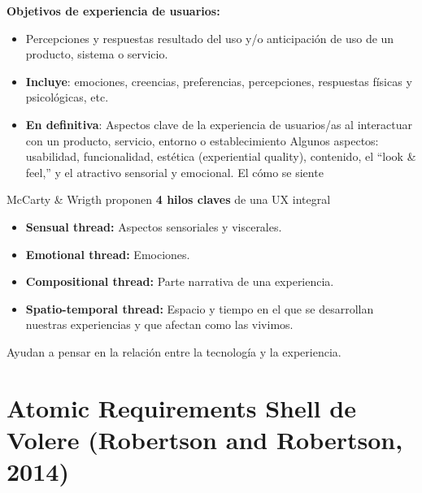 \documentclass[12pt]{report} %
\begin{document}
\textbf{Objetivos de experiencia de usuarios:}

\begin{itemize}

\item
  Percepciones y respuestas resultado del uso y/o anticipación de uso de
  un producto, sistema o servicio.
\item
\textbf{Incluye}: emociones, creencias, preferencias, percepciones, respuestas
  físicas y psicológicas, etc.
\item
\textbf{En definitiva}: Aspectos clave de la experiencia de usuarios/as al
  interactuar con un producto, servicio, entorno o establecimiento
  Algunos aspectos: usabilidad, funcionalidad, estética (experiential
  quality), contenido, el ``look \& feel,'' y el atractivo sensorial y
  emocional. El cómo se siente
\end{itemize}

McCarty \& Wrigth proponen \textbf{4 hilos claves} de una UX integral

\begin{itemize}

\item
\textbf{Sensual thread:} Aspectos sensoriales y viscerales.
\item
\textbf{Emotional thread:} Emociones.
\item
\textbf{Compositional thread:} Parte narrativa de una experiencia.
\item
\textbf{Spatio-temporal thread:} Espacio y tiempo en el que se desarrollan
  nuestras experiencias y que afectan como las vivimos.
\end{itemize}

Ayudan a pensar en la relación entre la tecnología y la experiencia.

\newpage

\section{Atomic Requirements Shell de Volere (Robertson and
Robertson, 2014)}
\end{document}
